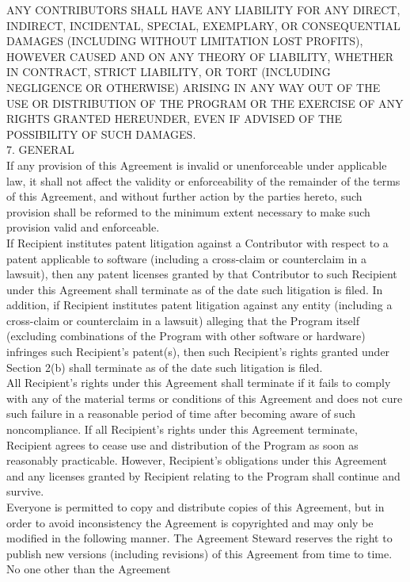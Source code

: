 {ANY CONTRIBUTORS SHALL HAVE ANY LIABILITY FOR ANY DIRECT, INDIRECT,
INCIDENTAL, SPECIAL, EXEMPLARY, OR CONSEQUENTIAL DAMAGES (INCLUDING
WITHOUT LIMITATION LOST PROFITS), HOWEVER CAUSED AND ON ANY THEORY OF
LIABILITY, WHETHER IN CONTRACT, STRICT LIABILITY, OR TORT (INCLUDING
NEGLIGENCE OR OTHERWISE) ARISING IN ANY WAY OUT OF THE USE OR
DISTRIBUTION OF THE PROGRAM OR THE EXERCISE OF ANY RIGHTS GRANTED
HEREUNDER, EVEN IF ADVISED OF THE POSSIBILITY OF SUCH DAMAGES.
\\[4pt]
7. GENERAL
\\[4pt]
If any provision of this Agreement is invalid or unenforceable under
applicable law, it shall not affect the validity or enforceability of
the remainder of the terms of this Agreement, and without further
action by the parties hereto, such provision shall be reformed to the
minimum extent necessary to make such provision valid and enforceable.
\\[4pt]
If Recipient institutes patent litigation against a Contributor with
respect to a patent applicable to software (including a cross-claim or
counterclaim in a lawsuit), then any patent licenses granted by that
Contributor to such Recipient under this Agreement shall terminate as
of the date such litigation is filed. In addition, if Recipient
institutes patent litigation against any entity (including a
cross-claim or counterclaim in a lawsuit) alleging that the Program
itself (excluding combinations of the Program with other software or
hardware) infringes such Recipient's patent(s), then such Recipient's
rights granted under Section 2(b) shall terminate as of the date such
litigation is filed.
\\[4pt]
All Recipient's rights under this Agreement shall terminate if it
fails to comply with any of the material terms or conditions of this
Agreement and does not cure such failure in a reasonable period of
time after becoming aware of such noncompliance. If all Recipient's
rights under this Agreement terminate, Recipient agrees to cease use
and distribution of the Program as soon as reasonably
practicable. However, Recipient's obligations under this Agreement and
any licenses granted by Recipient relating to the Program shall
continue and survive.
\\[4pt]
Everyone is permitted to copy and distribute copies of this Agreement,
but in order to avoid inconsistency the Agreement is copyrighted and
may only be modified in the following manner. The Agreement Steward
reserves the right to publish new versions (including revisions) of
this Agreement from time to time. No one other than the Agreement
}
